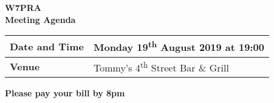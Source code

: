 \documentclass[letter,11pt]{extarticle}
\begin{document}
	\thispagestyle{empty}
	
	\begin{center}
		\textbf{W7PRA\\Meeting Agenda}
		\vspace{0.33cm}
	\end{center}
	
	\begin{center}
		\begin{tabular}{| m{3.0cm} | m{7.5cm} |} \hline
			\textbf{Date and Time} & Monday 19\textsuperscript{th} August 2019 at 19:00 \\ \hline
			\textbf{Venue} & Tommy's 4\textsuperscript{th} Street Bar \& Grill \\ \hline
				\end{tabular}
	\end{center}
	
	\begin{center}
		\textbf{Please pay your bill by 8pm}
	\end{center}
	
\end{document}
